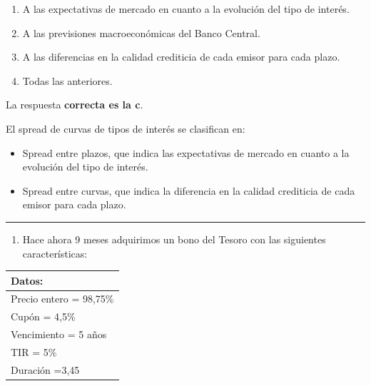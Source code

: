 \documentclass[
  letterpaper,
  DIV=11,
  numbers=noendperiod]{scrreprt}
\providecommand{\tightlist}{%
  \setlength{\itemsep}{0pt}\setlength{\parskip}{0pt}}\usepackage{longtable,booktabs,array}
\begin{document}
\begin{enumerate}
\def\labelenumi{\alph{enumi})}
\item
  A las expectativas de mercado en cuanto a la evolución del tipo de
  interés.
\item
  A las previsiones macroeconómicas del Banco Central.
\item
  A las diferencias en la calidad crediticia de cada emisor para cada
  plazo.
\item
  Todas las anteriores.
\end{enumerate}

\begin{tcolorbox}[enhanced jigsaw, left=2mm, opacityback=0, colback=white, breakable, arc=.35mm, bottomrule=.15mm, rightrule=.15mm, toprule=.15mm, leftrule=.75mm, colframe=quarto-callout-tip-color-frame]
\begin{minipage}[t]{5.5mm}
\textcolor{quarto-callout-tip-color}{\faLightbulb}
\end{minipage}%
\begin{minipage}[t]{\textwidth - 5.5mm}

La respuesta \textbf{correcta es la c}.

El spread de curvas de tipos de interés se clasifican en:

\begin{itemize}
\item
  Spread entre plazos, que indica las expectativas de mercado en cuanto
  a la evolución del tipo de interés.
\item
  Spread entre curvas, que indica la diferencia en la calidad crediticia
  de cada emisor para cada plazo.
\end{itemize}

\end{minipage}%
\end{tcolorbox}

\begin{center}\rule{0.5\linewidth}{0.5pt}\end{center}

\begin{enumerate}
\def\labelenumi{\arabic{enumi}.}
\setcounter{enumi}{105}
\tightlist
\item
  Hace ahora 9 meses adquirimos un bono del Tesoro con las siguientes
  características:
\end{enumerate}

\begin{longtable}[]{@{}l@{}}
\toprule()
\textbf{Datos:} \\
\midrule()
\endhead
Precio entero = 98,75\% \\
Cupón = 4,5\% \\
Vencimiento = 5 años \\
TIR = 5\% \\
Duración =3,45 \\
\bottomrule()
\end{longtable}
\end{document}

